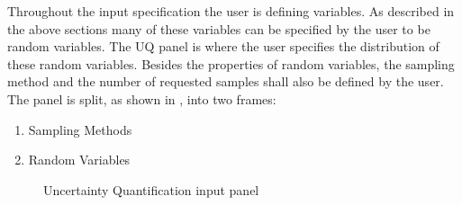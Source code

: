 Throughout the input specification the user is defining variables. As described
in the above sections many of these variables can be specified by the user to be
random variables. The UQ panel is where the user specifies the distribution of
these random variables. Besides the properties of random variables, the sampling
method and the number of requested samples shall also be defined by the user.
The panel is split, as shown in , into two frames:

\begin{enumerate}
\item Sampling Methods 
\item Random Variables
\end{enumerate}

\begin{figure}[!htbp]
  \caption{Uncertainty Quantification input panel}
  \label{fig:uq_panel}
\end{figure}

